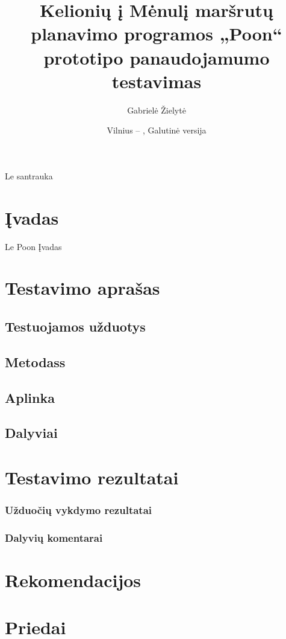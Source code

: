 \documentclass{VUMIFPSkursinis}
\title{Kelionių į Mėnulį maršrutų planavimo programos „Poon“ prototipo panaudojamumo testavimas}
\author{Gabrielė Žielytė}
\date{Vilnius – \the\year, Galutinė versija}
\begin{document}
	
\maketitle

\thispagestyle{empty}
\tableofcontents

\thispagestyle{empty}

\cleardoublepage{}
\setcounter{page}{3}

Le santrauka


\section{Įvadas}
Le Poon Įvadas


\section{Testavimo aprašas}
\subsection{Testuojamos užduotys}
\subsection{Metodass}
\subsection{Aplinka}
\subsection{Dalyviai}
\section{Testavimo rezultatai}
\subsubsection{Užduočių vykdymo rezultatai}
\subsubsection{Dalyvių komentarai}
\section{Rekomendacijos}
\section{Priedai}
\end{document}
